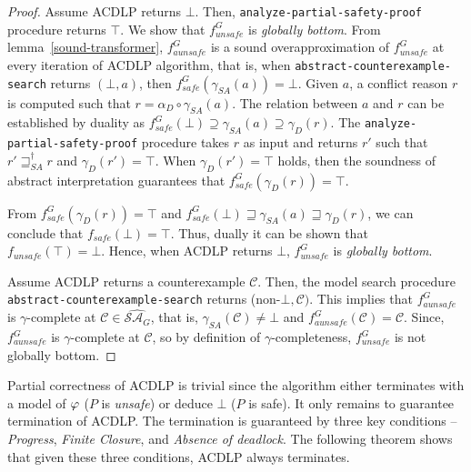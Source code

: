 \begin{proof}

Assume ACDLP returns $\bot$.  Then, \texttt{analyze-partial-safety-proof} 
procedure returns $\top$. We show that $f_{unsafe}^G$ is \emph{globally bottom}. 
From lemma~\ref{sound-transformer}, $f_{aunsafe}^G$ is a sound overapproximation 
of $f_{unsafe}^G$ at every iteration of ACDLP algorithm, that is, when 
\texttt{abstract-counterexample-search} returns $(\bot, a)$, then 
$f_{safe}^G(\gamma_{SA}(a)) = \bot$. Given $a$, a conflict reason $r$ is 
computed such that $r = \alpha_{D} \circ \gamma_{SA}(a)$.   The 
relation between $a$ and $r$ can be established by duality as 
$f_{safe}^G(\bot) \supseteq \gamma_{SA}(a) \supseteq \gamma_{D}(r)$. 
The \texttt{analyze-partial-safety-proof} procedure takes $r$ as input and 
returns $r'$ such that $r' \sqsupseteq_{SA}^\dagger r$ and $\gamma_{D}(r') = \top$.  
When $\gamma_{D}(r') = \top$ holds, then the soundness of abstract interpretation 
guarantees that $f_{safe}^G(\gamma_D(r)) = \top$.  

From $f_{safe}^G(\gamma_D(r)) = \top$ and 
$f_{safe}^G(\bot) \sqsupseteq \gamma_{SA}(a) \sqsupseteq \gamma_{D}(r)$, 
we can conclude that $f_{safe}(\bot) = \top$. Thus, dually it can be shown 
that $f_{unsafe}(\top) = \bot$. Hence, when ACDLP returns $\bot$, 
$f_{unsafe}^G$ is \emph{globally bottom}. 


Assume ACDLP returns a counterexample $\mathcal{C}$.  Then, 
the model search procedure \texttt{abstract-counterexample-search} returns 
(non-$\bot, \mathcal{C})$.  This implies that $f_{aunsafe}^G$ 
is $\gamma$-complete at $\mathcal{C} \in \widehat{\mathcal{SA}_G}$,
that is, $\gamma_{SA}(\mathcal{C}) \neq \bot$ and 
$f_{aunsafe}^G(\mathcal{C}) = \mathcal{C}$.  Since, 
$f_{aunsafe}^G$ is $\gamma$-complete at $\mathcal{C}$, 
so by definition of $\gamma$-completeness, $f_{unsafe}^G$ 
is not globally bottom. 
\end{proof}


Partial correctness of ACDLP is trivial since the algorithm either terminates with 
a model of $\varphi$ ($P$ is \emph{unsafe}) or deduce $\bot$ ($P$ is safe).  It 
only remains to guarantee termination of ACDLP.  The termination is guaranteed 
by three key conditions -- \emph{Progress}, \emph{Finite Closure}, and \emph{Absence 
of deadlock}.  The following theorem shows that given these three conditions, ACDLP 
always terminates.
%

